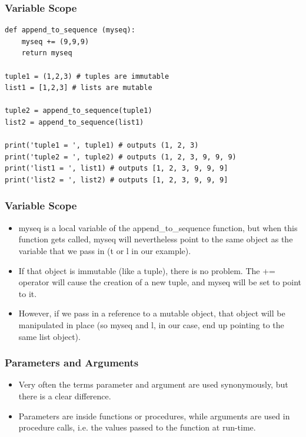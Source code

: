 \begin{frame}[fragile]\frametitle{Variable Scope}
\begin{lstlisting}
def append_to_sequence (myseq):
    myseq += (9,9,9)
    return myseq

tuple1 = (1,2,3) # tuples are immutable
list1 = [1,2,3] # lists are mutable

tuple2 = append_to_sequence(tuple1)
list2 = append_to_sequence(list1)

print('tuple1 = ', tuple1) # outputs (1, 2, 3)
print('tuple2 = ', tuple2) # outputs (1, 2, 3, 9, 9, 9)
print('list1 = ', list1) # outputs [1, 2, 3, 9, 9, 9]
print('list2 = ', list2) # outputs [1, 2, 3, 9, 9, 9]
\end{lstlisting}
  
\end{frame}

\begin{frame}[fragile]\frametitle{Variable Scope}
       \begin{itemize}
    \item  myseq is a local variable of the append\_to\_sequence function, but when this function gets called, myseq will nevertheless point to the same object as the variable that we pass in (t or l in our example).
    \item If that object is immutable (like a tuple), there is no problem. The += operator will cause the creation of a new tuple, and myseq will be set to point to it. 
    \item However, if we pass in a reference to a mutable object, that object will be manipulated in place (so myseq and l, in our case, end up pointing to the same list object).
                \end{itemize}

\end{frame}


\begin{frame}[fragile]\frametitle{Parameters and Arguments}
    \begin{itemize}
    \item Very often the terms parameter and argument are used synonymously, but there is a clear difference. 
        \item Parameters are inside functions or procedures, while arguments are used in procedure calls, i.e. the values passed to the function at run-time. 
            \end{itemize}
\end{frame}

